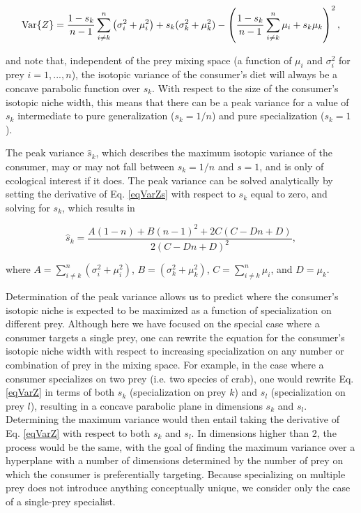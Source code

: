 \documentclass{frontiersSCNS}
\begin{document}
\begin{equation}
\label{eqVarZs}
{\rm Var}\{Z\} = \frac{1-s_k}{n-1}\sum_{i \neq k}^n \left(\sigma_i^2 + \mu_i^2\right) + s_k(\sigma_k^2 + \mu_k^2) - \left(\frac{1-s_k}{n-1}\sum_{i \neq k}^n \mu_i + s_k\mu_k \right)^2,
\end{equation}

\noindent and note that, independent of the prey mixing space (a function of $\mu_i$ and $\sigma_i^2$ for prey $i=1,...,n$), the isotopic variance of the consumer's diet will always be a concave parabolic function over $s_k$.
With respect to the size of the consumer's isotopic niche width, this means that there can be a peak variance for a value of $s_k$ intermediate to pure generalization ($s_k=1/n$) and pure specialization ($s_k=1$).

The peak variance $\hat s_k$, which describes the maximum isotopic variance of the consumer, may or may not fall between $s_k=1/n$ and $s=1$, and is only of ecological interest if it does.
The peak variance can be solved analytically by setting the derivative of Eq. \ref{eqVarZs} with respect to $s_k$ equal to zero, and solving for $s_k$, which results in

\begin{equation}
	\hat s_k = \frac{A(1-n)+B (n-1)^2+2 C (C-D n+D)}{2 (C-D n+D)^2},
\end{equation}

\noindent where $A = \sum_{i \neq k}^n \left(\sigma_i^2 + \mu_i^2\right)$, $B = \left(\sigma_k^2 + \mu_k^2\right)$, $C = \sum_{i \neq k}^n \mu_i$, and $D = \mu_k$.

Determination of the peak variance allows us to predict where the consumer's isotopic niche is expected to be maximized as a function of specialization on different prey.
Although here we have focused on the special case where a consumer targets a single prey, one can rewrite the equation for the consumer's isotopic niche width with respect to increasing specialization on any number or combination of prey in the mixing space.
For example, in the case where a consumer specializes on two prey (i.e. two species of crab), one would rewrite Eq. \ref{eqVarZ} in terms of both $s_k$ (specialization on prey $k$) and $s_l$ (specialization on prey $l$), resulting in a concave parabolic plane in dimensions $s_k$ and $s_l$.
Determining the maximum variance would then entail taking the derivative of Eq. \ref{eqVarZ} with respect to both $s_k$ and $s_l$.
In dimensions higher than 2, the process would be the same, with the goal of finding the maximum variance over a hyperplane with a number of dimensions determined by the number of prey on which the consumer is preferentially targeting.
Because specializing on multiple prey does not introduce anything conceptually unique, we consider only the case of a single-prey specialist.
\end{document}
